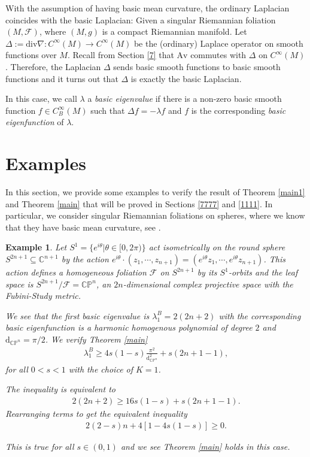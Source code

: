 \documentclass[11pt]{amsart}
\newtheorem{example}{Example}
\def\av{\mathrm{Av}}
\def\d{\mathrm{d}}
\def\div{\mathrm{div}}
\begin{document}
With the assumption of having basic mean curvature, the ordinary Laplacian coincides with the basic Laplacian: Given a singular Riemannian foliation $(M,\mathcal{F})$, where $(M,g)$ is a compact Riemannian manifold. Let $\Delta:=\div\nabla:C^\infty(M)\to C^\infty(M)$ be the (ordinary) Laplace operator on smooth functions over $M$. Recall from Section \ref{7} that $\av$ commutes with $\Delta$ on $C^\infty(M)$. Therefore, the Laplacian $\Delta$ sends basic smooth functions to basic smooth functions and it turns out that $\Delta$ is exactly the basic Laplacian.

In this case, we call $\lambda$ a \textit{basic eigenvalue} if there is a non-zero basic smooth function $f\in C_B^\infty(M)$ such that $\Delta f=-\lambda f$ and $f$ is the corresponding \textit{basic eigenfunction} of $\lambda$.
\section{Examples}\label{122}

In this section, we provide some examples to verify the result of Theorem \ref{main1} and Theorem \ref{main} that will be proved in  Sections \ref{7777} and \ref{1111}. In particular, we consider singular Riemannian foliations on spheres, where we know that they have basic mean curvature, see \cite{radeslyt}.


\begin{example}
    Let $S^1=\{e^{i\theta}\vert \theta\in [0,2\pi)\}$ act isometrically on the round sphere  $S^{2n+1}\subseteq \mathbb{C}^{n+1}$ by the action $e^{i\theta}\cdot (z_1,\cdots,z_{n+1})=(e^{i\theta}z_1,\cdots,e^{i\theta}z_{n+1})$. This action defines a homogeneous foliation $\mathcal{F}$ on $S^{2n+1}$ by its $S^1$-orbits and the leaf space is $S^{2n+1}/\mathcal{F}=\mathbb{CP}^n$, an $2n$-dimensional complex projective space with the Fubini-Study metric.

    We see that the first basic eigenvalue is $\lambda_1^B=2(2n+2)$ with the corresponding basic eigenfunction is a harmonic homogenous polynomial of degree $2$ and $\d_{\mathbb{CP}^n}=\pi/2$. We verify Theorem \ref{main}
    \begin{align*}
        \lambda_1^B\geq 4s(1-s)\frac{\pi^2}{\d_{\mathbb{CP}^n}^2}+s(2n+1-1),
    \end{align*}for all $0<s<1$ with the choice of $K=1$.

    The inequality is equivalent to
    \begin{align*}
        2(2n+2)\geq16s(1-s)+s(2n+1-1).
    \end{align*}Rearranging terms to get the equivalent inequality
    \begin{align*}
        2(2-s)n+4[1-4s(1-s)]\geq 0.
    \end{align*}

    This is true for all $s\in (0,1)$ and we see Theorem \ref{main} holds in this case. 
\end{example}
\end{document}
